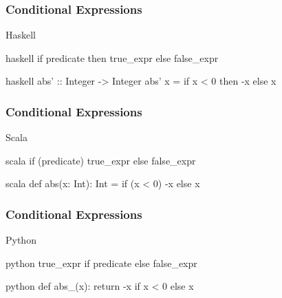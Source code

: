 \documentclass[dvipsnames]{beamer}
\theoremstyle{plain}
\begin{document}
\begin{frame}[fragile]
  \frametitle{Conditional Expressions}

  \begin{block}{Haskell}
    \begin{pygments}{haskell}
if predicate then true_expr else false_expr
    \end{pygments}
  \end{block}

  \medskip
  \begin{example}
    \begin{pygments}{haskell}
abs' :: Integer -> Integer
abs' x = if x < 0 then -x else x
    \end{pygments}
  \end{example}
\end{frame}

\begin{frame}[fragile]
  \frametitle{Conditional Expressions}

  \begin{block}{Scala}
    \begin{pygments}{scala}
if (predicate) true_expr else false_expr
    \end{pygments}
  \end{block}

  \medskip
  \begin{example}
    \begin{pygments}{scala}
def abs(x: Int): Int =
    if (x < 0) -x else x
    \end{pygments}
  \end{example}
\end{frame}

\begin{frame}[fragile]
  \frametitle{Conditional Expressions}

  \begin{block}{Python}
    \begin{pygments}{python}
true_expr if predicate else false_expr
    \end{pygments}
  \end{block}

  \medskip
  \begin{example}
    \begin{pygments}{python}
def abs_(x):
    return -x if x < 0 else x
    \end{pygments}
  \end{example}
\end{frame}
\end{document}

